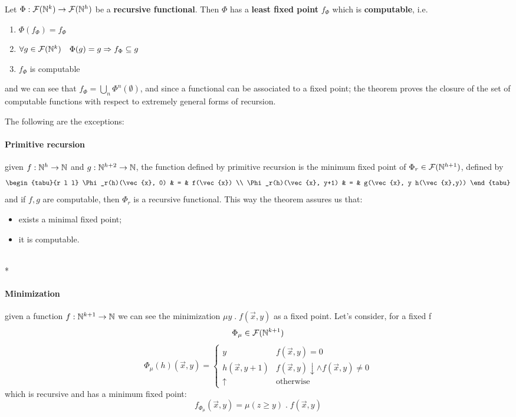 \begin{theorem}\label{th:first-recursion}
  Let $\Phi : \mathcal{F}(\mathbb{N}^k) \to \mathcal{F}(\mathbb{N}^h)$ be
  a \textbf{recursive functional}. Then $\Phi$ has a \textbf{least fixed point}
  $f_\Phi$ which is \textbf{computable}, i.e.
  \begin{enumerate}
  \item $\Phi(f_\Phi) = f_\Phi$
  \item $\forall g \in \mathcal{F}(\mathbb{N}^k) \quad \Phi(g) = g \Rightarrow f_\Phi \subseteq g$
  \item $f_\Phi$ is computable
  \end{enumerate}
  and we can see that $f_\Phi = \bigcup\limits_n
  \Phi^{n}(\emptyset)$, and since a functional can be associated to a
  fixed point; the theorem proves the closure of the set of computable
  functions with respect to extremely general forms of recursion.
\end{theorem}
 The following are the exceptions:
\paragraph{\textbf{Primitive recursion}}
given $f : \mathbb{N}^h \to \mathbb{N}$ and
$g : \mathbb{N}^{h+2} \to \mathbb{N}$, the function defined by primitive
recursion is the minimum fixed point of
$\Phi_r \in \mathcal{F}(\mathbb{N}^{h+1})$, defined by
\[
  \begin{tabu}{r l l}
    \Phi_r(h)(\vec{x}, 0) & = & f(\vec{x}) \\
    \Phi_r(h)(\vec{x}, y+1) & = & g(\vec{x}, y h(\vec{x},y))
  \end{tabu}
\]
and if $f,g$ are computable, then $\Phi_r$ is a recursive
functional. This way the theorem assures us that:
\begin{itemize}
\item exists a minimal fixed point;
\item it is computable.
\end{itemize}

\mbox{}\\*
\paragraph{\textbf{Minimization}}
given a function $f: \mathbb{N}^{k+1} \to \mathbb{N}$ we can see the
minimization $\mu y \; . \; f(\vec{x}, y)$ as a fixed point. Let's
consider, for a fixed f
\[
  \Phi_\mu \in \mathcal{F}(\mathbb{N}^{k+1})
\]
\[
  \Phi_\mu(h)(\vec{x}, y) = \begin{cases}
    y & f(\vec{x},y) = 0 \\
    h(\vec{x}, y+1) & f(\vec{x}, y)\downarrow \land f(\vec{x}, y) \neq 0 \\
    \uparrow & \mbox{otherwise}
  \end{cases}
\]
which is recursive and has a minimum fixed point:
\[
  f_{\Phi_\mu}(\vec{x}, y) = \mu (z \geq y) \; . \; f(\vec{x}, y)
\]

